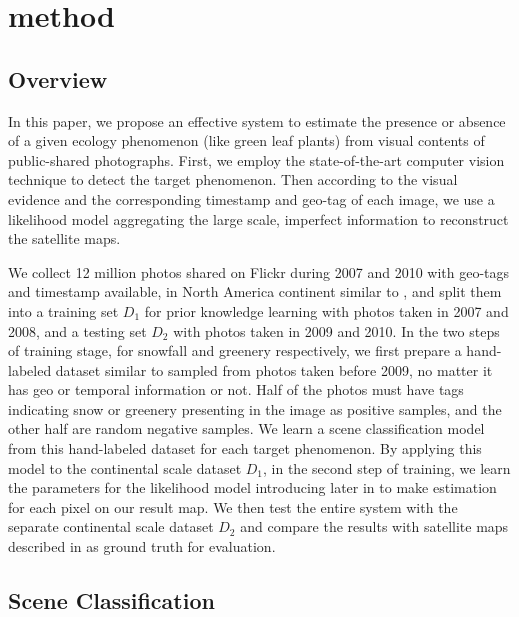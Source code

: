 \section{method}

\subsection{Overview}
In this paper, we propose an effective system to estimate the presence or absence 
of a given ecology phenomenon (like green leaf plants) 
from visual contents of public-shared photographs. First, we employ the state-of-the-art 
computer vision technique to detect the target phenomenon. Then according to the visual evidence 
and the corresponding timestamp and geo-tag of each image, we use a likelihood model 
aggregating the large scale, imperfect information to reconstruct the satellite maps.

We collect 12 million photos shared on Flickr during 2007 and 2010 with geo-tags and timestamp available, 
in North America continent similar to , and split them into a training set $D_1$ for prior knowledge 
learning with photos taken in 2007 and 2008, and a testing set $D_2$ with photos taken in 2009 and 2010.
In the two steps of training stage, for snowfall and greenery respectively, we first 
prepare a hand-labeled dataset similar to 
 sampled from photos taken 
before 2009, no matter it has geo or temporal 
information or not. Half of the photos must have tags indicating snow or greenery presenting 
in the image as positive samples, and the other half are random negative samples. 
We learn a scene classification model from this hand-labeled dataset for each target phenomenon. By  
applying this model to the continental scale dataset $D_1$, in the second step 
of training, we learn the parameters for the likelihood model introducing later 
in  to 
make estimation for each pixel on our result map. We then test the entire system with the separate continental 
scale dataset $D_2$ and compare the results with satellite maps described in  as ground 
truth for evaluation.

\subsection{Scene Classification}
